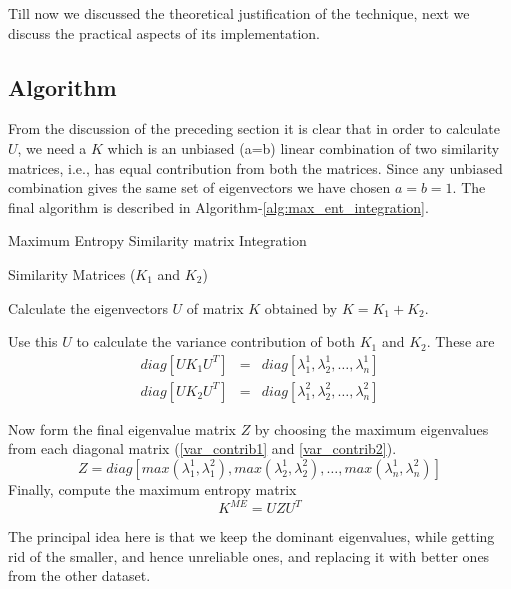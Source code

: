 Till now we discussed the theoretical justification of the technique, next we discuss the practical aspects of its implementation.

\subsection{Algorithm}
From the discussion of the preceding section it is clear that in order to calculate $U$, we need a $K$ which is an unbiased (a=b) linear combination of two similarity matrices, i.e., has equal contribution from both the matrices. Since any unbiased combination gives the same set of eigenvectors we have chosen $a=b=1$. The final algorithm is described in Algorithm-\ref{alg:max_ent_integration}.

\begin{algorithm}[h]
\caption{Maximum Entropy Similarity matrix Integration}
\label{alg:max_ent_integration}
\begin{algorithmic}[1]
\REQUIRE Similarity Matrices ($K_{1}$ and $K_{2}$) 

\STATE Calculate the eigenvectors $U$ of matrix $K$ obtained by $K = K_{1} + K_{2}$.

\STATE Use this $U$ to calculate the variance contribution of both $K_{1}$ and $K_{2}$. These are  
\begin{eqnarray}
	diag[UK_{1}U^{T}] &=&  diag[\lambda^{1}_{1},\lambda^{1}_{2},\dots,\lambda^{1}_{n}] \label{var_contrib1} \\
	diag[UK_{2}U^{T}] &=&  diag[\lambda^{2}_{1},\lambda^{2}_{2},\dots,\lambda^{2}_{n}] \label{var_contrib2}
\end{eqnarray}

\STATE Now form the final eigenvalue matrix $Z$ by choosing the maximum eigenvalues from each diagonal matrix (\ref{var_contrib1} and \ref{var_contrib2}).
\begin{displaymath}
	Z =  diag[max(\lambda^{1}_{1},\lambda^{2}_{1}),max(\lambda^{1}_{2},\lambda^{2}_{2}),\dots,max(\lambda^{1}_{n},\lambda^{2}_{n})] 
\end{displaymath}
\STATE Finally, compute the maximum entropy matrix 
\begin{displaymath}
	K^{ME} = UZU^{T}
\end{displaymath}
\end{algorithmic}
\end{algorithm}  

The principal idea here is that we keep the dominant eigenvalues, while getting rid of the smaller, and hence unreliable ones, and replacing it with better ones from the other dataset. 
